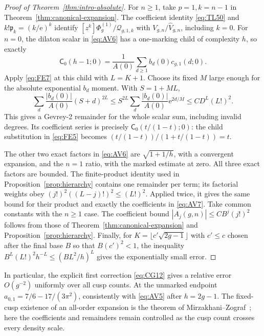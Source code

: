 \begin{proof}[Proof of Theorem~\ref{thm:intro-absolute}]
For $n\ge1$, take $p=1,k=n-1$ in
Theorem~\ref{thm:canonical-expansion}. The coefficient identity \eqref{eq:TL50}
and $k!\mathfrak p_k=(k/\mathrm{e})^k$ identify $[z^k]\Phi_g^{(1)}/\mathcal Q_{g,1,k}$
with $V_{g,n}/\widehat V_{g,n}$, including $k=0$.
For $n=0$, the dilaton scalar in \eqref{eq:AV6} has a one-marking
child of complexity $h$, so exactly
\[
 \mathsf C_0(h-1;0)=\frac1{A(0)}
       \sum_{d\ge1}b_d(0)c_{g,1}(d;0).
\]
Apply \eqref{eq:FE7} at this child with $L=K+1$.
Choose its fixed $M$ large enough for the absolute exponential
$b_d$ moment. With $S=1+ML$,
\[
 \sum_d\frac{|b_d(0)|}{A(0)}(S+d)^{2L}
 \le S^{2L}\sum_d\frac{|b_d(0)|}{A(0)}\mathrm{e}^{2d/M}
 \le C D^L(L!)^2.
\]
This gives a Gevrey-2 remainder for the whole scalar sum, including
invalid degrees. Its coefficient series is precisely
$\mathsf C_0(t/(1-t);0)$: the child substitution in \eqref{eq:FE5}
becomes $(t/(1-t))/(1+t/(1-t))=t$.

The other two exact factors in \eqref{eq:AV6} are
$\sqrt{1+1/h}$, with a convergent expansion, and the $n=1$ ratio,
with the marked estimate at zero. All three exact factors are bounded.
The finite-product identity used in Proposition~\ref{prop:hierarchy}
contains one remainder per term; its factorial weights obey
$(j!)^2((L-j)!)^2\le(L!)^2$. Applied twice, it gives the same
bound for their product and exactly the coefficients in \eqref{eq:AV7}.
Take common constants with the $n\ge1$ case. The coefficient bound
$|A_j(g,n)|\le CB^j(j!)^2$ follows from those of
Theorem~\ref{thm:canonical-expansion} and Proposition~\ref{prop:hierarchy}.
Finally, for $K=\lfloor c'\sqrt{2g-1}\rfloor$ with $c'\le c$ chosen after
the final base $B$ so that $B(c')^2<1$, the inequality
$B^L(L!)^2h^{-L}\le(BL^2/h)^L$ gives the exponentially small error.
\end{proof}

In particular, the explicit first correction \eqref{eq:CG12}
gives a relative error $O(g^{-2})$ uniformly over all cusp counts.
At the unmarked endpoint $a_{0,1}=7/6-17/(3\pi^2)$, consistently
with \eqref{eq:AV5} after $h=2g-1$.
The fixed-cusp existence of an all-order expansion is the theorem
of Mirzakhani--Zograf~\cite{MZ}; here the coefficients and remainders
remain controlled as the cusp count crosses every density scale.
